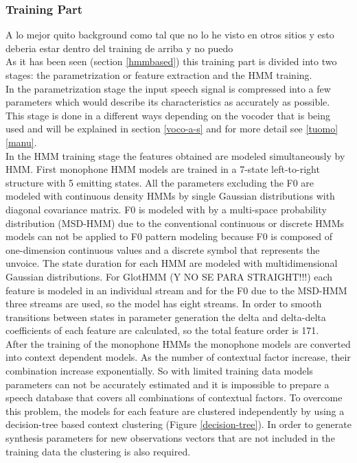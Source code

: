 \subsubsection{Training Part}\label{tpart} A lo mejor quito background como tal que no lo he visto en otros sitios y esto deberia estar dentro del training de arriba y no puedo\\
As it has been seen (section \ref{hmmbased}) this training part is divided into two stages: the parametrization or feature extraction and the HMM training.\\
In the parametrization stage the input speech signal is compressed into a few parameters which would describe its characteristics as accurately as possible. This stage is done in a different ways depending on the vocoder that is being used and will be explained in section \ref{voco-a-s} and for more detail see \ref{tuomo} \ref{manu}.\\
In the HMM training stage the features obtained are modeled simultaneously by HMM. First monophone HMM models are trained in a 7-state left-to-right structure with 5 emitting states. All the parameters excluding the F0 are modeled with continuous density HMMs by single Gaussian distributions with diagonal covariance matrix. F0 is modeled with by a multi-space probability distribution (MSD-HMM) due to the conventional continuous or discrete HMMs models can not be applied to F0 pattern modeling because F0 is composed of one-dimension continuous values and a discrete symbol that represents the unvoice. The state duration for each HMM are modeled with multidimensional Gaussian distributions. For GlotHMM (Y NO SE PARA STRAIGHT!!!) each feature is modeled in an individual stream  and for the F0 due to the MSD-HMM three streams are used, so the model has eight streams. In order to smooth transitions between states in parameter generation the delta and delta-delta coefficients of each feature are calculated, so the total feature order is 171.\\
After the training of the monophone HMMs the monophone models are converted into context dependent models. As the number of contextual factor increase, their combination increase exponentially. So with limited training data models parameters can not be accurately estimated and it is impossible to prepare a speech database that covers all combinations of contextual factors. To overcome this problem, the models for each feature are clustered independently by using a decision-tree based context clustering (Figure \ref{decision-tree}). In order to generate synthesis parameters for new observations vectors that are not included in the training data the clustering is also required.
